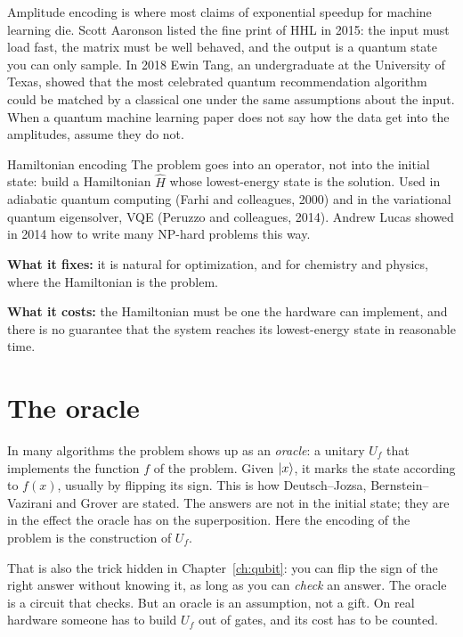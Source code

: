 Amplitude encoding is where most claims of exponential speedup for machine learning
die. Scott Aaronson listed the fine print of HHL in 2015: the input must load fast,
the matrix must be well behaved, and the output is a quantum state you can only
sample. In 2018 Ewin Tang, an undergraduate at the University of Texas, showed that
the most celebrated quantum recommendation algorithm could be matched by a classical
one under the same assumptions about the input. When a quantum machine learning
paper does not say how the data get into the amplitudes, assume they do not.

\begin{concept}{Hamiltonian encoding}
The problem goes into an operator, not into the initial state: build a Hamiltonian
$\hat H$ whose lowest-energy state is the solution. Used in adiabatic quantum
computing (Farhi and colleagues, 2000) and in the variational quantum eigensolver,
VQE (Peruzzo and colleagues, 2014). Andrew Lucas showed in 2014 how to write many
NP-hard problems this way.

\textbf{What it fixes:} it is natural for optimization, and for chemistry and
physics, where the Hamiltonian is the problem.

\textbf{What it costs:} the Hamiltonian must be one the hardware can implement, and
there is no guarantee that the system reaches its lowest-energy state in reasonable
time.
\end{concept}

\section{The oracle}

In many algorithms the problem shows up as an \emph{oracle}: a unitary $U_f$ that
implements the function $f$ of the problem. Given $\ket{x}$, it marks the state
according to $f(x)$, usually by flipping its sign. This is how Deutsch--Jozsa,
Bernstein--Vazirani and Grover are stated. The answers are not in the initial
state; they are in the effect the oracle has on the superposition. Here the encoding
of the problem is the construction of $U_f$.

That is also the trick hidden in Chapter~\ref{ch:qubit}: you can flip the sign of
the right answer without knowing it, as long as you can \emph{check} an answer.
The oracle is a circuit that checks. But an oracle is an assumption, not a gift.
On real hardware someone has to build $U_f$ out of gates, and its cost has to be
counted.

